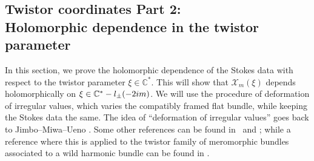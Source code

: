 \documentclass[11pt]{article}
\numberwithin{equation}{section}
\numberwithin{equation}{section}
\begin{document}
\subsection[Twistor coordinates Part 2: Holomorphic dependence in the twistor parameter]{Twistor coordinates Part 2:\\ Holomorphic dependence in the twistor parameter}

In this section, we prove the holomorphic dependence of the Stokes data with respect to the twistor parameter $\xi \in \mathbb{C}^*$. This will show that $\mathcal{X}_{m}(\xi)$ depends holomorphically on $\xi \in \mathbb{C}^*-l_{\pm}(-2{\rm i}m)$. We will use the procedure of deformation of irregular values, which varies the compatibly framed flat bundle, while keeping the Stokes data the same. The idea of ``deformation of irregular values'' goes back to Jimbo--Miwa--Ueno \cite{JMU}. Some other references can be found in~\cite{B} and \cite{M6}; while a reference where this is applied to the twistor family of meromorphic bundles associated to a wild harmonic bundle can be found in \cite[Chapters 3, 4, 9 and 11]{M}.
\end{document}
